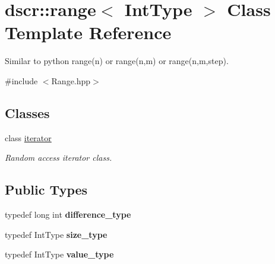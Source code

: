 \hypertarget{classdscr_1_1range}{\section{dscr\-:\-:range$<$ Int\-Type $>$ Class Template Reference}
\label{classdscr_1_1range}
}


Similar to python range(n) or range(n,m) or range(n,m,step).  




{\ttfamily \#include $<$Range.\-hpp$>$}

\subsection*{Classes}
\begin{DoxyCompactItemize}
\item 
class \hyperlink{classdscr_1_1range_1_1iterator}{iterator}
\begin{DoxyCompactList}\small\item\em Random access iterator class. \end{DoxyCompactList}\end{DoxyCompactItemize}
\subsection*{Public Types}
\begin{DoxyCompactItemize}
\item 
\hypertarget{classdscr_1_1range_a9103a7d7e47ee61a4573fc90b807d68f}{typedef long int {\bfseries difference\-\_\-type}}\label{classdscr_1_1range_a9103a7d7e47ee61a4573fc90b807d68f}

\item 
\hypertarget{classdscr_1_1range_acc40f3c534fdf9efcbeea0de92d650ba}{typedef Int\-Type {\bfseries size\-\_\-type}}\label{classdscr_1_1range_acc40f3c534fdf9efcbeea0de92d650ba}

\item 
\hypertarget{classdscr_1_1range_ab64808d7c694e90230fd27b90f8256ab}{typedef Int\-Type {\bfseries value\-\_\-type}}\label{classdscr_1_1range_ab64808d7c694e90230fd27b90f8256ab}

\end{DoxyCompactItemize}
